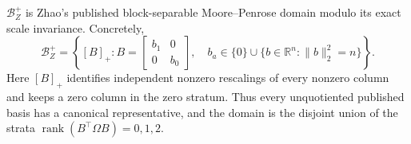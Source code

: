 \(\mathcal B_Z^+\) is Zhao's published block-separable Moore--Penrose domain modulo its exact scale invariance.  Concretely,
\[
 \mathcal B_Z^+=
 \left\{[B]_+:B=\begin{bmatrix}b_1&0\\0&b_0\end{bmatrix},\quad
 b_a\in\{0\}\cup\{b\in\mathbb R^n:\lVert b\rVert_2^2=n\}\right\}.
\]
Here \([B]_+\) identifies independent nonzero rescalings of every nonzero column and keeps a zero column in the zero stratum.  Thus every unquotiented published basis has a canonical representative, and the domain is the disjoint union of the strata \(\operatorname{rank}(B^{\top}\Omega B)=0,1,2\).